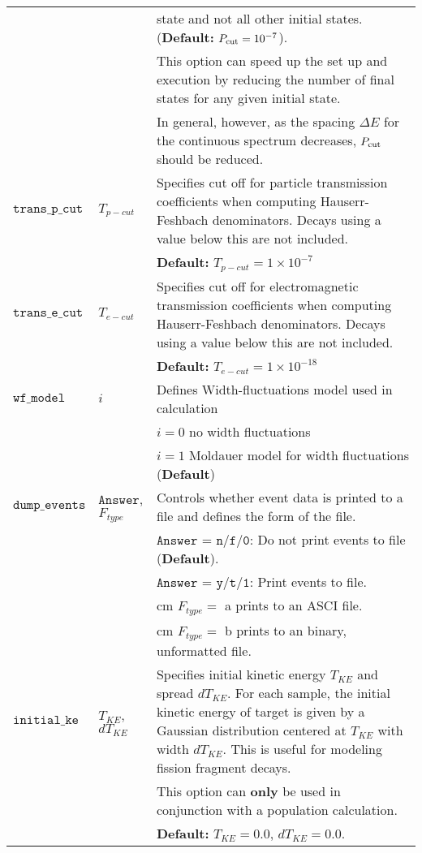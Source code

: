 \documentclass[
10pt,
showpacs,preprintnumbers,footinbib,
amsfonts,amsmath,amssymb,
aps,
prc,twocolumn,groupedaddress,superscriptaddress,
showkeys,
nofootinbib
]{revtex4-1}
\begin{document}
\begin{center}
\begin{tabular}{| p{4cm} | p{4cm} | p{9cm} |}
 & &    state and not all other initial states. ({\bf Default:} $P_{\rm cut} = 10^{-7}$).\\
 & & This option can speed up the set up and execution by reducing the number of final states for any given initial state.\\
 & & In general, however, as the spacing $\Delta E$ for the continuous spectrum decreases, $P_{\rm cut}$ should be reduced.\\
\hline
${\texttt{trans\_p\_cut}}$ & $T_{p-cut}$ & Specifies cut off for particle transmission coefficients when computing Hauserr-Feshbach denominators. Decays using a value below this are not included.\\
& & {\bf Default:} $T_{p-cut} = 1\times 10^{-7}$\\
\hline
${\texttt{trans\_e\_cut}}$ & $T_{e-cut}$ & Specifies cut off for electromagnetic transmission coefficients when computing Hauserr-Feshbach denominators. Decays using a value below this are not included.\\
& & {\bf Default:} $T_{e-cut} = 1\times 10^{-18}$\\
\hline
${\texttt{wf\_model}}$  & $i$ &    Defines Width-fluctuations model used in calculation \\
& &    $i = 0$ no width fluctuations\\
& &    $i = 1$ Moldauer model for width fluctuations ({\bf Default})\\
\hline
${\texttt{dump\_events}}$ & ${\texttt{Answer}}$, $F_{type}$ & Controls whether event data is printed to a file and defines the form of the file.\\
& & ${\texttt{Answer}}$ = ${\texttt{n/f/0}}$: Do not print events to file ({\bf Default}).\\
& & ${\texttt{Answer}}$ = ${\texttt{y/t/1}}$: Print events to file.\\
& & \hskip 1.2 cm $F_{type} =$ a prints to an ASCI file.\\
& & \hskip 1.2 cm $F_{type} =$ b prints to an binary, unformatted file.\\
\hline
${\texttt{initial\_ke}}$ & $T_{KE}$, $dT_{KE}$ & Specifies initial kinetic energy $T_{KE}$ and spread $dT_{KE}$. For each sample, the initial kinetic energy of target is given by a Gaussian distribution centered at $T_{KE}$ with width $dT_{KE}$. This is useful for modeling fission fragment decays.\\
& & This option can {\bf only} be used in conjunction with a population calculation.\\
& & {\bf Default:} $T_{KE} = 0.0$, $dT_{KE} = 0.0$.\\
\hline
\end{tabular}
\end{center}
\end{document}
